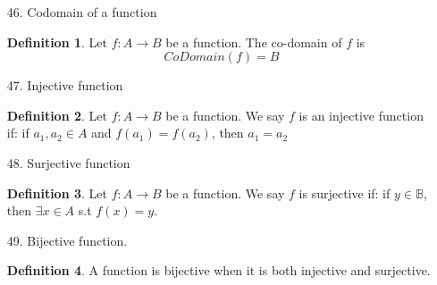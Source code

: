 \documentclass{article}
\theoremstyle{claim}
\theoremstyle{definition}
\newtheorem{definition}{Definition}
\begin{document}
\begin{enumerate}
    \item[46.] Codomain of a function
        \begin{definition}
            Let $f: A \rightarrow B$ be a function. The co-domain of $f$ is
            \begin{equation*}
                CoDomain(f) = B
            \end{equation*}
        \end{definition}

    \item[47.] Injective function
        \begin{definition}
            Let $f: A \rightarrow B$ be a function. We say $f$ is an injective function if: if $a_1, a_2 \in A$ and $f(a_1) = f(a_2)$, then $a_1 = a_2$
        \end{definition}

    \item[48.] Surjective function
        \begin{definition}
            Let $f: A \rightarrow B$ be a function. We say $f$ is surjective if: if $y \in \mathbb{B}$, then $\exists x \in A$ s.t $f(x) = y$.
        \end{definition}

    \item[49.] Bijective function.
        \begin{definition}
            A function is bijective when it is both injective and surjective.
        \end{definition}
\end{enumerate}
\end{document}
